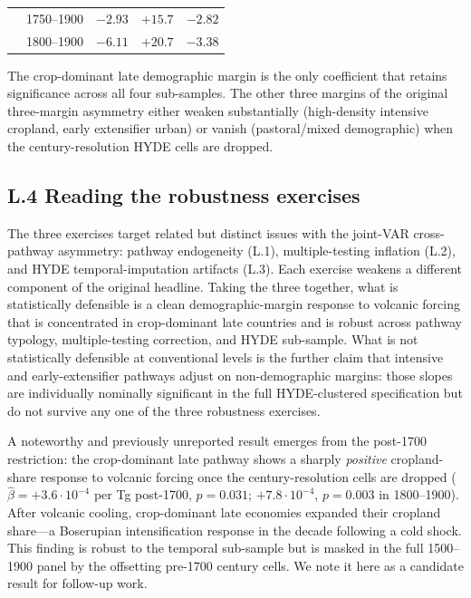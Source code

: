 \documentclass[11pt,letterpaper]{article}
\begin{document}
\begin{table}[H]
\begin{tabular}{llrrr}
                       & 1750--1900               & $-2.93$           & $+15.7$ \quad *   & $-2.82$ \quad * \\
                       & 1800--1900               & $-6.11$           & $+20.7$           & $-3.38$         \\
\bottomrule
\end{tabular}
\par\smallskip\footnotesize{The crop-dominant late demographic margin is the only coefficient that retains significance across all four sub-samples. The other three margins of the original three-margin asymmetry either weaken substantially (high-density intensive cropland, early extensifier urban) or vanish (pastoral/mixed demographic) when the century-resolution HYDE cells are dropped.}
\end{table}

\subsection*{L.4 Reading the robustness exercises}
\label{app:joint-var-reading}

The three exercises target related but distinct issues with the joint-VAR cross-pathway asymmetry: pathway endogeneity (L.1), multiple-testing inflation (L.2), and HYDE temporal-imputation artifacts (L.3). Each exercise weakens a different component of the original headline. Taking the three together, what is statistically defensible is a clean demographic-margin response to volcanic forcing that is concentrated in crop-dominant late countries and is robust across pathway typology, multiple-testing correction, and HYDE sub-sample. What is not statistically defensible at conventional levels is the further claim that intensive and early-extensifier pathways adjust on non-demographic margins: those slopes are individually nominally significant in the full HYDE-clustered specification but do not survive any one of the three robustness exercises.

A noteworthy and previously unreported result emerges from the post-1700 restriction: the crop-dominant late pathway shows a sharply \emph{positive} cropland-share response to volcanic forcing once the century-resolution cells are dropped ($\hat\beta = +3.6\!\cdot\!10^{-4}$ per Tg post-1700, $p = 0.031$; $+7.8\!\cdot\!10^{-4}$, $p = 0.003$ in 1800--1900). After volcanic cooling, crop-dominant late economies expanded their cropland share---a Boserupian intensification response in the decade following a cold shock. This finding is robust to the temporal sub-sample but is masked in the full 1500--1900 panel by the offsetting pre-1700 century cells. We note it here as a candidate result for follow-up work.
\end{document}
